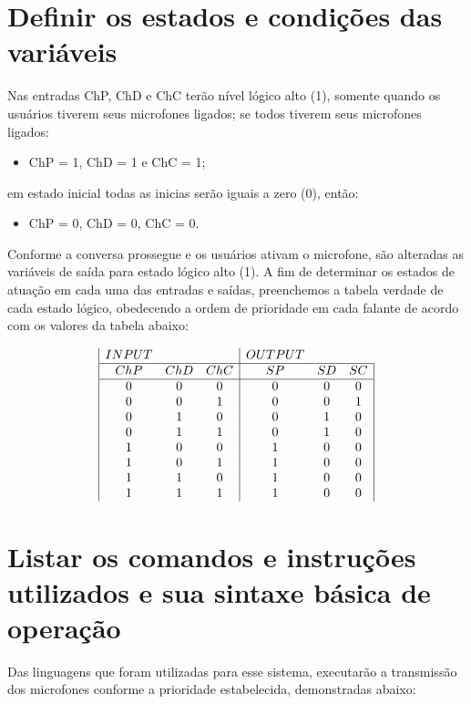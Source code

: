 \documentclass{article}
\begin{document}
\section{Definir os estados e condições das variáveis}
Nas entradas ChP, ChD e ChC terão nível lógico alto (1), somente quando os usuários tiverem seus microfones ligados; se todos tiverem seus microfones ligados: 
\begin{itemize}
\item ChP = 1, ChD = 1 e ChC = 1; 
\end{itemize}
em estado inicial todas as inicias serão iguais a zero (0), então: 
\begin{itemize}
	\item ChP = 0, ChD = 0, ChC = 0.
\end{itemize}
Conforme a conversa prossegue e os usuários ativam o microfone, são alteradas as variáveis de saída para estado lógico alto (1). A fim de determinar os estados de atuação em cada uma das entradas e saídas, preenchemos a tabela verdade de cada estado lógico, obedecendo a ordem de prioridade em cada falante de acordo com os valores da tabela abaixo:

\begin{displaymath}
\begin{array}{|c c c|c c c|}
INPUT & & & OUTPUT &\\
\hline
ChP & ChD & ChC & SP & SD & SC\\
\hline %
0 & 0 & 0 & 0 & 0 & 0\\
0 & 0 & 1 & 0 & 0 & 1\\
0 & 1 & 0 & 0 & 1 & 0\\
0 & 1 & 1 & 0 & 1 & 0\\
1 & 0 & 0 & 1 & 0 & 0\\
1 & 0 & 1 & 1 & 0 & 0\\
1 & 1 & 0 & 1 & 0 & 0\\
1 & 1 & 1 & 1 & 0 & 0\\
\end{array}
\end{displaymath}

\section{Listar os comandos e instruções utilizados e sua sintaxe básica de operação}
Das linguagens que foram utilizadas para esse sistema, executarão a transmissão dos microfones conforme a prioridade estabelecida, demonstradas abaixo:
\end{document}
